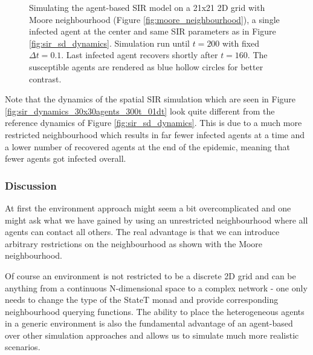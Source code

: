 \begin{figure}
\begin{center}
	\caption{Simulating the agent-based SIR model on a 21x21 2D grid with Moore neighbourhood (Figure \ref{fig:moore_neighbourhood}), a single infected agent at the center and same SIR parameters as in Figure \ref{fig:sir_sd_dynamics}. Simulation run until $t = 200$ with fixed $\Delta t = 0.1$. Last infected agent recovers shortly after $t = 160$. The susceptible agents are rendered as blue hollow circles for better contrast.}
	\label{fig:sir_env}
\end{center}
\end{figure}

Note that the dynamics of the spatial SIR simulation which are seen in Figure \ref{fig:sir_dynamics_30x30agents_300t_01dt} look quite different from the reference dynamics of Figure \ref{fig:sir_sd_dynamics}. This is due to a much more restricted neighbourhood which results in far fewer infected agents at a time and a lower number of recovered agents at the end of the epidemic, meaning that fewer agents got infected overall.

\subsubsection{Discussion}
At first the environment approach might seem a bit overcomplicated and one might ask what we have gained by using an unrestricted neighbourhood where all agents can contact all others. The real advantage is that we can introduce arbitrary restrictions on the neighbourhood as shown with the Moore neighbourhood.

Of course an environment is not restricted to be a discrete 2D grid and can be anything from a continuous N-dimensional space to a complex network - one only needs to change the type of the StateT monad and provide corresponding neighbourhood querying functions. The ability to place the heterogeneous agents in a generic environment is also the fundamental advantage of an agent-based over other simulation approaches and allows us to simulate much more realistic scenarios.